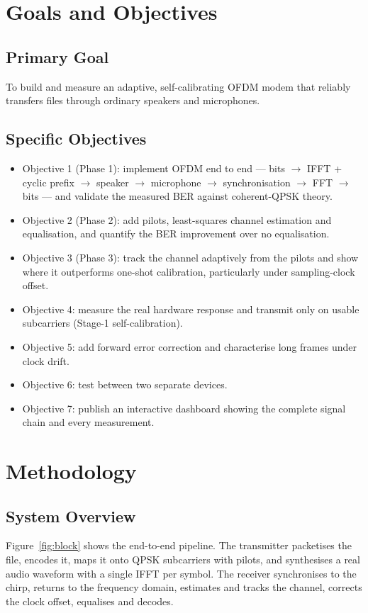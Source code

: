 \documentclass[11pt,a4paper]{report}
\begin{document}
\chapter{Goals and Objectives}

\section{Primary Goal}
To build and measure an adaptive, self-calibrating OFDM modem that reliably transfers
files through ordinary speakers and microphones.

\section{Specific Objectives}
\begin{itemize}
    \item Objective 1 (Phase 1): implement OFDM end to end --- bits $\rightarrow$
    IFFT + cyclic prefix $\rightarrow$ speaker $\rightarrow$ microphone $\rightarrow$
    synchronisation $\rightarrow$ FFT $\rightarrow$ bits --- and validate the measured
    BER against coherent-QPSK theory.
    \item Objective 2 (Phase 2): add pilots, least-squares channel estimation and
    equalisation, and quantify the BER improvement over no equalisation.
    \item Objective 3 (Phase 3): track the channel adaptively from the pilots and show
    where it outperforms one-shot calibration, particularly under sampling-clock offset.
    \item Objective 4: measure the real hardware response and transmit only on usable
    subcarriers (Stage-1 self-calibration).
    \item Objective 5: add forward error correction and characterise long frames under
    clock drift.
    \item Objective 6: test between two separate devices.
    \item Objective 7: publish an interactive dashboard showing the complete signal chain
    and every measurement.
\end{itemize}

\chapter{Methodology}

\section{System Overview}
Figure~\ref{fig:block} shows the end-to-end pipeline. The transmitter packetises the
file, encodes it, maps it onto QPSK subcarriers with pilots, and synthesises a real
audio waveform with a single IFFT per symbol. The receiver synchronises to the chirp,
returns to the frequency domain, estimates and tracks the channel, corrects the
clock offset, equalises and decodes.
\end{document}
